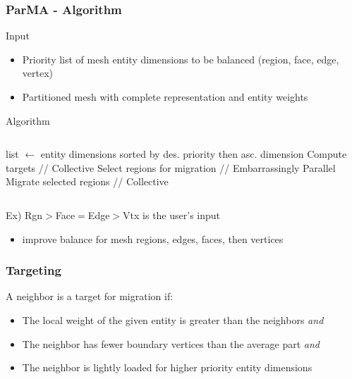 \documentclass{beamer}
\begin{document}
\begin{frame}
  \frametitle{ParMA - Algorithm}
  Input
  \begin{itemize}
    \item Priority list of mesh entity dimensions to be balanced (region,
      face, edge, vertex)
    \item Partitioned mesh with complete representation and entity weights
  \end{itemize}
  Algorithm
  \begin{columns}
    \begin{column}{\textwidth}
      \begin{algorithmic}
          \State list $\gets$ entity dimensions sorted by des. priority then
          asc. dimension
              \State Compute targets // Collective
              \State Select regions for migration // Embarrassingly Parallel
              \State Migrate selected regions // Collective
            \EndFor
          \EndFor
      \end{algorithmic}
    \end{column}
  \end{columns}

  \bigskip
  Ex) Rgn$>$Face$=$Edge$>$Vtx is the user's input
  \begin{itemize}
    \item improve balance for mesh regions, edges, faces, then vertices
  \end{itemize}
\end{frame}

\begin{frame}
  \frametitle{Targeting}
  A neighbor is a target for migration if:
  \begin{itemize}
    \item The local weight of the given entity is greater than the neighbors \emph{and}
    \item The neighbor has fewer boundary vertices than the average part \emph{and}
    \item The neighbor is lightly loaded for higher priority entity dimensions
  \end{itemize}
\end{frame}
\end{document}
